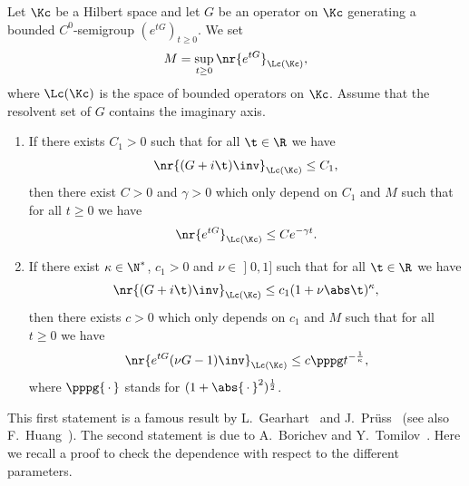 \begin{theo}\label{th-GPH-BT}
Let $\Kc$ be a Hilbert space and let $G$ be an operator on $\Kc$ generating a bounded $C^0$-semigroup $(e^{tG})_{t \geq 0}$. We set
\[
M = \sup_{t \geq 0} \nr{e^{tG}}_{\Lc(\Kc)},
\]
where $\Lc(\Kc)$ is the space of bounded operators on $\Kc$. Assume that the resolvent set of $G$ contains the imaginary axis.
\begin{enumerate}%
\item If there exists $C_1 > 0$ such that for all $\t \in \R$ we have
\[
\nr{(G+i\t)\inv}_{\Lc(\Kc)} \leq C_1,
\]
then there exist $C > 0$ and $\gamma > 0$ which only depend on $C_1$ and $M$ such that for all $t \geq 0$ we have
\[
\nr{e^{tG}}_{\Lc(\Kc)} \leq C e^{-\gamma t}.
\]
\item If there exist $\kappa \in \N^*$, $c_1 > 0$ and $\nu \in\mathopen{]}0,1]$ such that for all $\t \in \R$ we have
\[
\nr{(G+i\t)\inv}_{\Lc(\Kc)} \leq c_1 (1+ \nu \abs \t)^{\kappa},
\]
then there exists $c > 0$ which only depends on $c_1$ and $M$ such that for all $t \geq 0$ we have
\[
\nr{e^{tG}(\nu G - 1)\inv}_{\Lc(\Kc)} \leq c \pppg t^{-\frac 1 \kappa},
\]
where $\pppg{\,\cdot\,}$ stands for $(1+\abs{\,\cdot\,}^2)^{\frac 12}$.
\end{enumerate}
\end{theo}

This first statement is a famous result by L.~Gearhart~\cite{Gearhart78} and J.~Pr\"uss~\cite{Pruss84} (see also F.~Huang~\cite{Huang85}). The second statement is due to A.~Borichev and Y.~Tomilov~\cite{BorichevTo10}. Here we recall a proof to check the dependence with respect to the different parameters.

